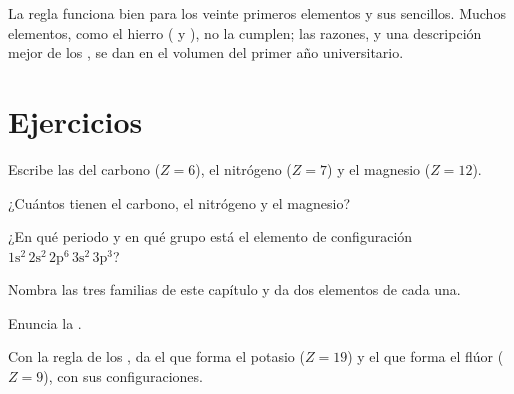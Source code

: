 \begin{remark}\label{rem:g10:electron-shells:limits}
La regla funciona bien para los veinte primeros elementos y sus 
sencillos. Muchos elementos, como el hierro ( y
), no la cumplen; las razones, y una descripción mejor de
los , se dan en el volumen del primer año universitario.
\end{remark}

\section{Ejercicios}

\begin{exercise}[$\star$]\label{exo:g10:electron-shells:1}
Escribe las  del carbono ($Z = 6$), el
nitrógeno ($Z = 7$) y el magnesio ($Z = 12$).
\end{exercise}

\begin{exercise}[$\star$]\label{exo:g10:electron-shells:2}
¿Cuántos  tienen el carbono, el nitrógeno y el
magnesio?
\end{exercise}

\begin{exercise}[$\star$]\label{exo:g10:electron-shells:3}
¿En qué periodo y en qué grupo está el elemento de configuración
$1\mathrm{s}^2\,2\mathrm{s}^2\,2\mathrm{p}^6\,3\mathrm{s}^2\,3\mathrm{p}^3$?
\end{exercise}

\begin{exercise}[$\star$]\label{exo:g10:electron-shells:4}
Nombra las tres familias de este capítulo y da dos elementos de cada una.
\end{exercise}

\begin{exercise}[$\star$]\label{exo:g10:electron-shells:5}
Enuncia la .
\end{exercise}

\begin{exercise}[$\star\star$]\label{exo:g10:electron-shells:6}
Con la regla de los , da el  que forma el potasio
($Z = 19$) y el que forma el flúor ($Z = 9$), con sus configuraciones.
\end{exercise}


